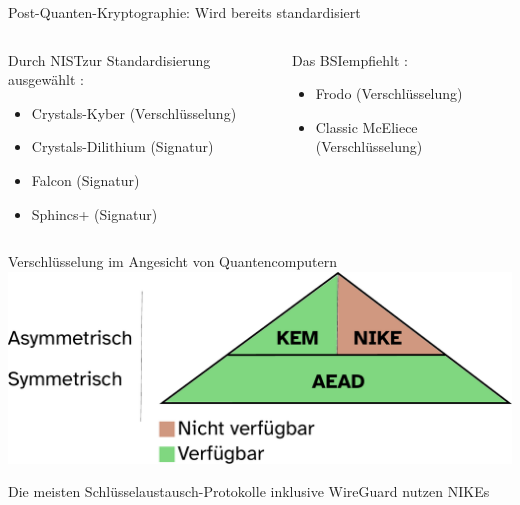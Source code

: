 \documentclass{rosenpass-beamer}
\begin{document}
\begin{frame}{Post-Quanten-Kryptographie: Wird bereits standardisiert}

\begin{columns}[T]
\begin{column}{.50\textwidth}

\large Durch NIST\footnotemark zur Standardisierung ausgewählt \cite{nist-selected-algorithms}:
\normalsize


\vspace{2mm}

\begin{itemize}
    \item Crystals-Kyber (Verschlüsselung)
    \item Crystals-Dilithium (Signatur)
    \item Falcon (Signatur)
    \item Sphincs+ (Signatur)
\end{itemize}

\end{column}

\begin{column}{.50\textwidth}
\large Das BSI\footnotemark empfiehlt \cite{bsi-quantensicher-gestalten}\normalsize:

\vspace{2mm}

\begin{itemize}
    \item Frodo (Verschlüsselung)
    \item Classic McEliece (Verschlüsselung)
\end{itemize}

\end{column}
\end{columns}

\end{frame}

\begin{frame}[label=NIKE]{Verschlüsselung im Angesicht von Quantencomputern}
    \includegraphics[height=.6\textheight]{graphics/Primitivenpyramide.pdf}
      
    Die meisten Schlüsselaustausch-Protokolle inklusive WireGuard nutzen NIKEs    
\end{frame}
\end{document}
